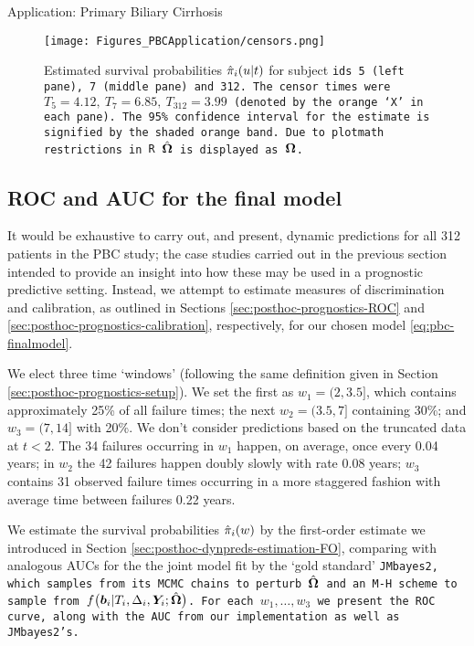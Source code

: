 \begin{chapter}{\label{cha:app-PBC}Application: Primary Biliary Cirrhosis}
  \begin{figure}[ht]
      \centering
      \texttt{[image: Figures\_PBCApplication/censors.png]}
      \caption{Estimated survival probabilities $\hat{\pi}_i\!\left( u|t\right)$ for subject \tt{id}s 5 (left pane), 7 (middle pane) and 312. The censor times were $T_5=4.12,\ T_7=6.85,\ T_{312}=3.99$ (denoted by the orange `X' in each pane). The 95\% confidence interval for the estimate is signified by the shaded orange band. Due to \tt{plotmath} restrictions in \tt{R} $\hat{\bm{\Omega}}$ is displayed as $\bm{\mathrm{\Omega}}$.}
      \label{fig:pbc-final-model-dynpreds-censors}
  \end{figure}

  \resettocmain
  \subsection{ROC and AUC for the final model}\label{sec:pbc-finalmodel-rocauc}
  It would be exhaustive to carry out, and present, dynamic predictions for all 312 patients in the PBC study; the case studies carried out in the previous section intended to provide an insight into how these may be used in a prognostic predictive setting. Instead, we attempt to estimate measures of discrimination and calibration, as outlined in Sections \ref{sec:posthoc-prognostics-ROC} and \ref{sec:posthoc-prognostics-calibration}, respectively, for our chosen model \eqref{eq:pbc-finalmodel}.

  We elect three time `windows' (following the same definition given in Section \ref{sec:posthoc-prognostics-setup}). We set the first as $w_1=(2,3.5]$, which contains approximately 25\% of all failure times; the next $w_2=(3.5,7]$ containing 30\%; and $w_3=(7,14]$ with 20\%. We don't consider predictions based on the truncated data at $t<2$. The 34 failures occurring in $w_1$ happen, on average, once every 0.04 years; in $w_2$ the 42 failures happen doubly slowly with rate 0.08 years; $w_3$ contains 31 observed failure times occurring in a more staggered fashion with average time between failures 0.22 years.
  
  We estimate the survival probabilities $\hat{\pi}_i\!\left( w\right)$ by the first-order estimate we introduced in Section \ref{sec:posthoc-dynpreds-estimation-FO}, comparing with analogous AUCs for the the joint model fit by the `gold standard' \tt{JMbayes2}, which samples from its MCMC chains to perturb $\hat{\bm{\Omega}}$ and an M-H scheme to sample from $f\big(\bm{b}_i|T_i, \Delta_i, \bm{Y}_i; \hat{\bm{\Omega}}\big)$. For each $w_1,\dots,w_3$ we present the ROC curve, along with the AUC from our implementation as well as \tt{JMbayes2}'s.


\end{chapter}
